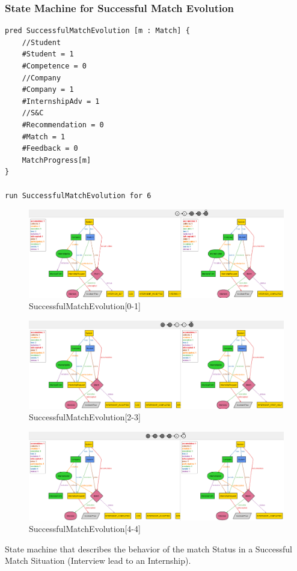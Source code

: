 \clearpage

\subsubsection{State Machine for Successful Match Evolution}
\begin{lstlisting}
pred SuccessfulMatchEvolution [m : Match] {
	//Student
	#Student = 1
	#Competence = 0
	//Company
	#Company = 1
	#InternshipAdv = 1
	//S&C
	#Recommendation = 0
	#Match = 1
	#Feedback = 0
	MatchProgress[m]
}

run SuccessfulMatchEvolution for 6
\end{lstlisting}

\begin{figure}[h]
    \centering
    \includegraphics[width=1\textwidth]{Images/AlloyModel_images/SuccessfulMatchEvolution[0-1].png}
    \caption{SuccessfulMatchEvolution[0-1]}
    \label{fig:figure2}
\end{figure}
\begin{figure}[h]
    \centering
    \includegraphics[width=1\textwidth]{Images/AlloyModel_images/SuccessfulMatchEvolution[2-3].png}
    \caption{SuccessfulMatchEvolution[2-3]}
    \label{fig:figure2}
\end{figure}
\begin{figure}[h]
    \centering
    \includegraphics[width=1\textwidth]{Images/AlloyModel_images/SuccessfulMatchEvolution[4-4].png}
    \caption{SuccessfulMatchEvolution[4-4]}
    \label{fig:figure2}
\end{figure}
State machine that describes the behavior of the match Status in a Successful Match Situation (Interview lead to an Internship).

